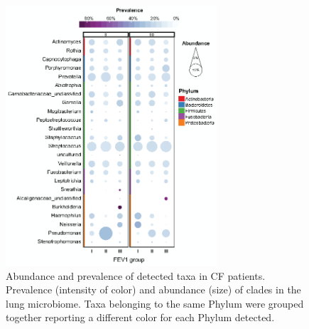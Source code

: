 \begin{figure}[!tb]
	\centering
	\includegraphics[width=0.7\textwidth]{./figures/Chapter_7/Figure_2_16s}
  	\caption{\label{fig:fig216s} Abundance and prevalence of detected taxa in CF patients. Prevalence (intensity of color) and abundance (size) of clades in the lung microbiome. Taxa belonging to the same Phylum were grouped together reporting a different color for each Phylum detected.}
\end{figure}

